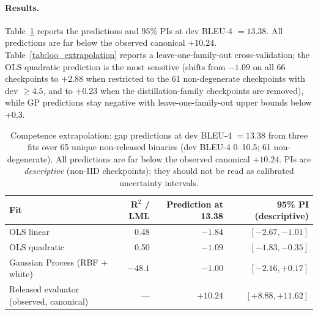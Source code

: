 \documentclass[pdflatex,sn-chicago]{sn-jnl}
\begin{document}
\paragraph{Results.}
Table~\ref{tab:extrapolation} reports the predictions and 95\% PIs at dev BLEU-4 $=13.38$. All predictions are far below the observed canonical $+10.24$. Table~\ref{tab:loo_extrapolation} reports a leave-one-family-out cross-validation; the OLS quadratic prediction is the most sensitive (shifts from $-1.09$ on all 66 checkpoints to $+2.88$ when restricted to the 61 non-degenerate checkpoints with dev $\geq 4.5$, and to $+0.23$ when the distillation-family checkpoints are removed), while GP predictions stay negative with leave-one-family-out upper bounds below $+0.3$.

\begin{table}[h]
\centering
\small
\caption{Competence extrapolation: gap predictions at dev BLEU-4 $=13.38$ from three fits over 65 unique non-released binaries (dev BLEU-4 0--10.5; 61 non-degenerate). All predictions are far below the observed canonical $+10.24$. PIs are \emph{descriptive} (non-IID checkpoints); they should not be read as calibrated uncertainty intervals.}
\label{tab:extrapolation}
\begin{tabular}{lrrr}
\toprule
Fit & R$^2$ / LML & Prediction at 13.38 & 95\% PI (descriptive) \\
\midrule
OLS linear & 0.48 & $-1.84$ & $[-2.67, -1.01]$ \\
OLS quadratic & 0.50 & $-1.09$ & $[-1.83, -0.35]$ \\
Gaussian Process (RBF + white) & $-48.1$ & $-1.00$ & $[-2.16, +0.17]$ \\
\midrule
Released evaluator (observed, canonical) & --- & $+10.24$ & $[+8.88, +11.62]$ \\
\bottomrule
\end{tabular}
\end{table}
\end{document}

